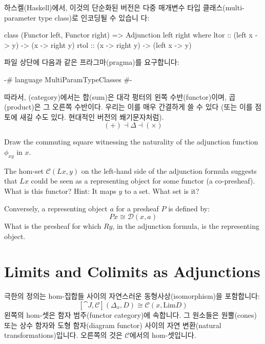 \documentclass[DaoFP]{subfiles}
\begin{document}
하스켈(Haskell)에서, 이것의 단순화된 버전은 다중 매개변수 타입 클래스(multi-parameter type class)로 인코딩될 수 있습니 다:
\begin{haskell}
class (Functor left, Functor right) => Adjunction left right where
  ltor :: (left x -> y) -> (x -> right y)
  rtol :: (x -> right y) -> (left x -> y)
\end{haskell}
파일 상단에 다음과 같은 프라그마(pragma)를 요구합니다:
\begin{haskell}
{-# language MultiParamTypeClasses #-}
\end{haskell}



따라서, (category)에서는 합(sum)은 대각 펑터의 왼쪽 수반(functor)이며, 곱(product)은 그 오른쪽 수반이다. 우리는 이를 매우 간결하게 쓸 수 있다 (또는 이를 점토에 새길 수도 있다. 현대적인 버전의 쐐기문자처럼).
\[ (+) \dashv \Delta \dashv (\times) \]

\begin{exercise}
Draw the commuting square witnessing the naturality of the adjunction function $\phi_{x y}$ in $x$.
\end{exercise}

\begin{exercise}
The hom-set $\mathcal{C} (L x, y)$ on the left-hand side of the adjunction formula suggests that $L x$ could be seen as a representing object for some functor (a co-presheaf). What is this functor? Hint: It maps $y$ to a set. What set is it?
\end{exercise}

\begin{exercise}
Conversely, a representing object $a$ for a presheaf $P$ is defined by:
\[P x \cong \mathcal{D}(x, a)\]
What is the presheaf for which $R y$, in the adjunction formula, is the representing object.
\end{exercise}

\section{Limits and Colimits as Adjunctions}

극한의 정의는 hom-집합들 사이의 자연스러운 동형사상(isomorphism)을 포함합니다:
\[ [\cat J, \mathcal{C}](\Delta_x, D)  \cong \mathcal{C}(x, \text{Lim} D) \]
왼쪽의 hom-셋은 함자 범주(functor category)에 속합니다. 그 원소들은 원뿔(cones) 또는 상수 함자와 도형 함자(diagram functor) 사이의 자연 변환(natural transformations)입니다. 오른쪽의 것은 $\mathcal{C}$에서의 hom-셋입니다.
\end{document}
